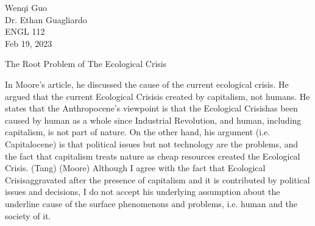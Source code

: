 \documentclass[12pt]{article}
\newcommand{\EC}{Ecological Crisis}
\begin{document}
\begin{flushleft}

Wenqi Guo\\
Dr. Ethan Guagliardo\\
ENGL 112\\
Feb 19, 2023\\

\begin{center}
The Root Problem of The Ecological Crisis
\end{center}



\setlength{\parindent}{0.5in}


In Moore's article, he discussed the cause of the current ecological crisis. He argued that the current \EC is created by capitalism, not humans. He states that the Anthropocene's viewpoint is that the \EC has been caused by human as a whole since Industrial Revolution, and human, including capitalism, is not part of nature. On the other hand, his argument (i.e. Capitalocene) is that political issues but not technology are the problems, and the fact that capitalism treats nature as cheap resources created the \EC. (Tang) (Moore)
Although I agree with the fact that \EC aggravated after the presence of capitalism and it is contributed by political issues and decisions, I do not accept his underlying assumption about the underline cause of the surface phenomenons and problems, i.e. human and the society of it.



\end{flushleft}
\end{document}
